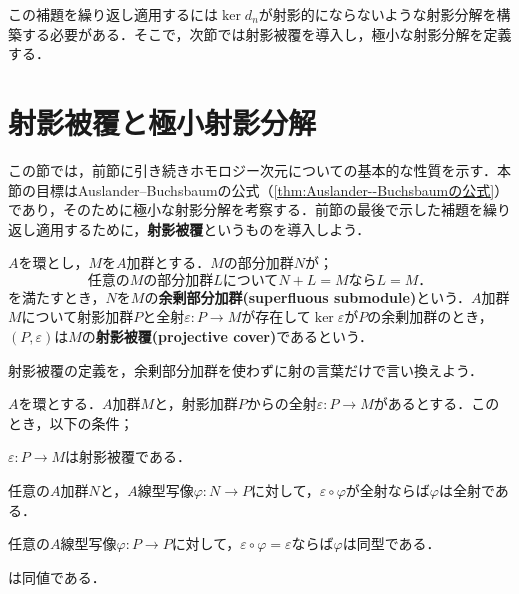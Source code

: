 この補題を繰り返し適用するには$\ker d_n$が射影的にならないような射影分解を構築する必要がある．そこで，次節では射影被覆を導入し，極小な射影分解を定義する．

\section{射影被覆と極小射影分解}

この節では，前節に引き続きホモロジー次元についての基本的な性質を示す．本節の目標はAuslander--Buchsbaumの公式（\ref{thm:Auslander--Buchsbaumの公式}）であり，そのために極小な射影分解を考察する．前節の最後で示した補題を繰り返し適用するために，\textbf{射影被覆}というものを導入しよう．

\begin{defi}[射影被覆]\label{defi:射影被覆}
	$A$を環とし，$M$を$A$加群とする．$M$の部分加群$N$が；
	\[\text{任意の$M$の部分加群$L$について$N+L=M$なら$L=M$．}\]
	を満たすとき，$N$を$M$の\textbf{余剰部分加群(superfluous submodule)}という．$A$加群$M$について射影加群$P$と全射$\varepsilon:P\to M$が存在して$\ker\varepsilon$が$P$の余剰加群のとき，$(P,\varepsilon)$は$M$の\textbf{射影被覆(projective cover)}であるという．
\end{defi}

射影被覆の定義を，余剰部分加群を使わずに射の言葉だけで言い換えよう．
\begin{prop}\label{prop:射影被覆の言い換え}
	$A$を環とする．$A$加群$M$と，射影加群$P$からの全射$\varepsilon:P\to M$があるとする．このとき，以下の条件；
	\begin{sakura}
		\item $\varepsilon:P\to M$は射影被覆である．
		\item 任意の$A$加群$N$と，$A$線型写像$\varphi:N\to P$に対して，$\varepsilon\circ\varphi$が全射ならば$\varphi$は全射である．
		\item 任意の$A$線型写像$\varphi:P\to P$に対して，$\varepsilon\circ\varphi=\varepsilon$ならば$\varphi$は同型である．
	\end{sakura}
	は同値である．
\end{prop}

